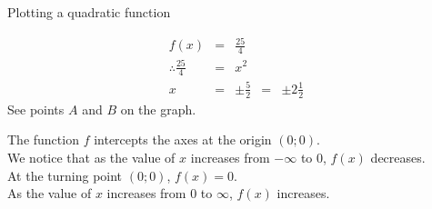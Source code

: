 \begin{wex}{Plotting a quadratic function}
{
\begin{equation*}
 \begin{array}{ccl}
f(x) &=& \frac{25}{4} \\
\therefore \frac{25}{4} &=& x^{2} \\
x &=& \pm \frac{5}{2} 
  &=& \pm 2\frac{1}{2} 
\end{array}
\end{equation*}
See points $A$ and $B$ on the graph.

The function $f$ intercepts the axes at the origin $(0;0)$.\\
We notice that as the value of $x$ increases from $-\infty$ to $0$, $f(x)$ decreases.\\
At the turning point $(0;0)$, $f(x) = 0$. \\
As the value of $x$ increases from $0$ to $\infty$, $f(x)$ increases.
}
\end{wex}

\clearpage
